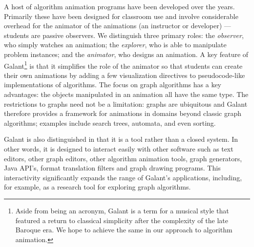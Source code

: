   A host of algorithm animation programs have been developed over the
  years. Primarily these have been designed for classroom use and involve
  considerable overhead for the animator of the animations (an instructor or
  developer) --- students are passive observers.  We distinguish three
  primary roles: the \emph{observer}, who simply watches an animation; the
  \emph{explorer}, who is able to manipulate problem instances; and the
  \emph{animator}, who designs an animation.  A key feature of Galant\footnote{
    Aside from being an acronym, Galant is a term for a musical style
that featured a return to classical simplicity after the complexity of the late Baroque era. We hope to achieve the same in our approach to algorithm animation.
} is that
  it simplifies the role of the animator so that students can create their
  own animations by adding a few visualization directives to pseudocode-like
  implementations of algorithms.  The focus on graph algorithms has a key
  advantages: the objects manipulated in an animation all have the same
  type.
  The restrictions to graphs need not be a limitation:
  graphs are ubiquitous and Galant therefore provides a framework for
  animations in domains beyond classic graph algorithms; examples include
  search trees, automata, and even sorting.

  Galant is also distinguished in that it is a tool rather than a closed
  system.  In other words, it is designed to interact easily with other
  software such as text editors, other graph editors, other algorithm
  animation tools, graph generators, Java API's, format translation filters
  and graph drawing programs. This interactivity significantly expands the
  range of Galant's applications, including, for example, as a research tool
  for exploring graph algorithms.

